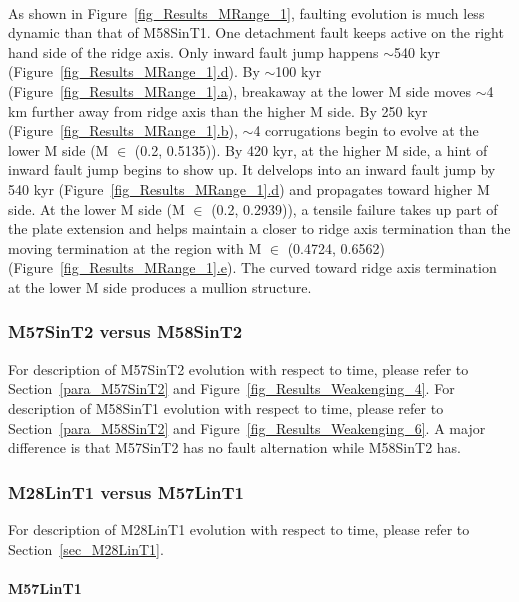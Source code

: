 ~\\
As shown in Figure~\hyperref[fig_Results_MRange_1]{\ref{fig_Results_MRange_1}}, faulting evolution is much less dynamic than that of M58SinT1. One detachment fault keeps active on the right hand side of the ridge axis. Only inward fault jump happens $\sim$540 kyr (Figure~\hyperref[fig_Results_MRange_1]{\ref{fig_Results_MRange_1}.d}). By $\sim$100 kyr (Figure~\hyperref[fig_Results_MRange_1]{\ref{fig_Results_MRange_1}.a}), breakaway at the lower M side moves $\sim$4 km further away from ridge axis than the higher M side. By 250 kyr (Figure~\hyperref[fig_Results_MRange_1]{\ref{fig_Results_MRange_1}.b}), $\sim$4 corrugations begin to evolve at the lower M side (M $\in$ (0.2, 0.5135)). By 420 kyr, at the higher M side, a hint of inward fault jump begins to show up. It delvelops into an inward fault jump by 540 kyr (Figure~\hyperref[fig_Results_MRange_1]{\ref{fig_Results_MRange_1}.d}) and propagates toward higher M side. At the lower M side (M $\in$ (0.2, 0.2939)), a tensile failure takes up part of the plate extension and helps maintain a closer to ridge axis termination than the moving termination at the region with M $\in$ (0.4724, 0.6562) (Figure~\hyperref[fig_Results_MRange_1]{\ref{fig_Results_MRange_1}.e}). The curved toward ridge axis termination at the lower M side produces a mullion structure.

\subsubsection{M57SinT2 versus M58SinT2}

For description of M57SinT2 evolution with respect to time, please refer to Section~\hyperref[para_M57SinT2]{\ref{para_M57SinT2}} and Figure~\hyperref[fig_Results_Weakenging_4]{\ref{fig_Results_Weakenging_4}}. For description of M58SinT1 evolution with respect to time, please refer to Section~\hyperref[para_M58SinT2]{\ref{para_M58SinT2}} and Figure~\hyperref[fig_Results_Weakenging_6]{\ref{fig_Results_Weakenging_6}}. A major difference is that M57SinT2 has no fault alternation while M58SinT2 has.

\subsubsection{M28LinT1 versus M57LinT1}

For description of M28LinT1 evolution with respect to time, please refer to Section~\hyperref[sec_M28LinT1]{\ref{sec_M28LinT1}}.

\paragraph{M57LinT1}\label{para_M57LinT1}

